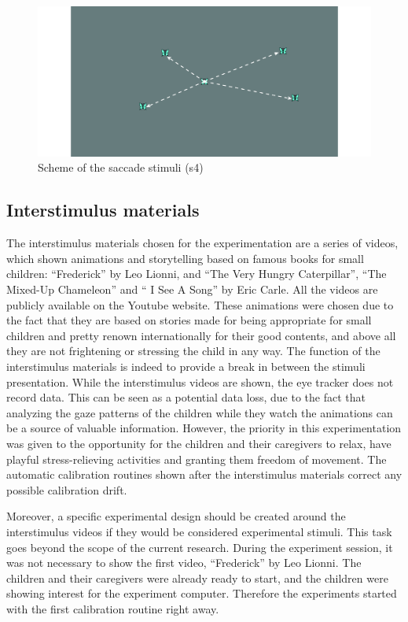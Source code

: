 \begin{figure}[h]
  \centering
  \includegraphics[width=.8\textwidth]{figures/stimulitarget-12.jpg}
  \caption[Saccade stimuli screenshots]{Scheme of the saccade stimuli (s4)}
  \label{fig:saccadescreens}
\end{figure}

\subsection{Interstimulus materials}
\label{sec:expinterstimulus}

The interstimulus materials chosen for the experimentation are a series of videos, which shown animations and storytelling based on famous books for small children: “Frederick” by Leo Lionni, and “The Very Hungry Caterpillar”, “The Mixed-Up Chameleon” and “ I See A Song” by Eric Carle. All the videos are publicly available on the Youtube website. These animations were chosen due to the fact that they are based on stories made for being appropriate for small children and pretty renown internationally for their good contents, and above all they are not frightening or stressing the child in any way. The function of the interstimulus materials is indeed to provide a break in between the stimuli presentation. While the interstimulus videos are shown, the eye tracker does not record data. This can be seen as a potential data loss, due to the fact that analyzing the gaze patterns of the children while they watch the animations can be a source of valuable information. However, the priority in this experimentation was given to the opportunity for the children and their caregivers to relax, have playful stress-relieving activities and granting them freedom of movement. The automatic calibration routines shown after the interstimulus materials correct any possible calibration drift.

Moreover, a specific experimental design should be created around the interstimulus videos if they would be considered experimental stimuli. This task goes beyond the scope of the current research.
During the experiment session, it was not necessary to show the first video, “Frederick” by Leo Lionni. The children and their caregivers were already ready to start, and the children were showing interest for the experiment computer. Therefore the experiments started with the first calibration routine right away.

